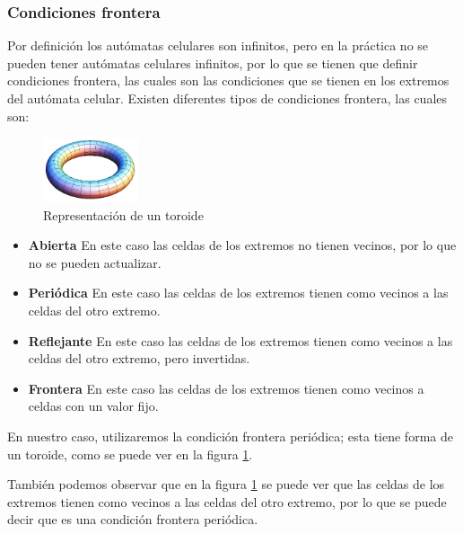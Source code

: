     \subsubsection{Condiciones frontera}
        Por definici\'on los aut\'omatas celulares son infinitos, pero en la pr\'actica no se pueden tener aut\'omatas celulares
            infinitos, por lo que se tienen que definir condiciones frontera, las cuales son las condiciones que se tienen en los
            extremos del aut\'omata celular. Existen diferentes tipos de condiciones frontera, las cuales son:
            \vskip 0.5cm
        \begin{figure}
            \centering
            \includegraphics[width=0.25\textwidth]{./images/marco_teorico/automatas_celulares/torus.png}
            \caption{Representaci\'on de un toroide \cite{Sharma2022}}
            \label{fig:toroide}
        \end{figure}
        \begin{itemize}
            \item \textbf{Abierta} En este caso las celdas de los extremos no tienen vecinos, por lo que no se pueden actualizar.
            \item \textbf{Peri\'odica} En este caso las celdas de los extremos tienen como vecinos a las celdas del otro extremo.
            \item \textbf{Reflejante} En este caso las celdas de los extremos tienen como vecinos a las celdas del otro extremo, pero
                invertidas.
            \item \textbf{Frontera} En este caso las celdas de los extremos tienen como vecinos a celdas con un valor fijo.
        \end{itemize}
    \vskip 0.5cm
    En nuestro caso, utilizaremos la condici\'on frontera peri\'odica; esta tiene forma de un toroide, como se puede ver en la figura
        \ref{fig:toroide}.
        \vskip 0.5cm
        
        Tambi\'en podemos observar que en la figura \ref{fig:toroide} se puede ver que las celdas de los extremos tienen como
            vecinos a las celdas del otro extremo, por lo que se puede decir que es una condici\'on frontera peri\'odica.
        \vskip 0.5cm